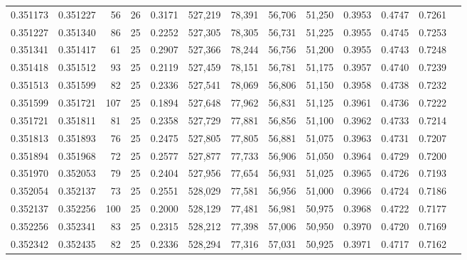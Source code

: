 \begin{tabular}{rrrrrrrrrrrrr}
0.351173 & 0.351227 &    56 &  26 &                                     0.3171 & 527,219 &  78,391 &  56,706 &  51,250 & 0.3953 & 0.4747 & 0.7261 \\
0.351227 & 0.351340 &    86 &  25 &                                     0.2252 & 527,305 &  78,305 &  56,731 &  51,225 & 0.3955 & 0.4745 & 0.7253 \\
0.351341 & 0.351417 &    61 &  25 &                                     0.2907 & 527,366 &  78,244 &  56,756 &  51,200 & 0.3955 & 0.4743 & 0.7248 \\
0.351418 & 0.351512 &    93 &  25 &                                     0.2119 & 527,459 &  78,151 &  56,781 &  51,175 & 0.3957 & 0.4740 & 0.7239 \\
0.351513 & 0.351599 &    82 &  25 &                                     0.2336 & 527,541 &  78,069 &  56,806 &  51,150 & 0.3958 & 0.4738 & 0.7232 \\
0.351599 & 0.351721 &   107 &  25 &                                     0.1894 & 527,648 &  77,962 &  56,831 &  51,125 & 0.3961 & 0.4736 & 0.7222 \\
0.351721 & 0.351811 &    81 &  25 &                                     0.2358 & 527,729 &  77,881 &  56,856 &  51,100 & 0.3962 & 0.4733 & 0.7214 \\
0.351813 & 0.351893 &    76 &  25 &                                     0.2475 & 527,805 &  77,805 &  56,881 &  51,075 & 0.3963 & 0.4731 & 0.7207 \\
0.351894 & 0.351968 &    72 &  25 &                                     0.2577 & 527,877 &  77,733 &  56,906 &  51,050 & 0.3964 & 0.4729 & 0.7200 \\
0.351970 & 0.352053 &    79 &  25 &                                     0.2404 & 527,956 &  77,654 &  56,931 &  51,025 & 0.3965 & 0.4726 & 0.7193 \\
0.352054 & 0.352137 &    73 &  25 &                                     0.2551 & 528,029 &  77,581 &  56,956 &  51,000 & 0.3966 & 0.4724 & 0.7186 \\
0.352137 & 0.352256 &   100 &  25 &                                     0.2000 & 528,129 &  77,481 &  56,981 &  50,975 & 0.3968 & 0.4722 & 0.7177 \\
0.352256 & 0.352341 &    83 &  25 &                                     0.2315 & 528,212 &  77,398 &  57,006 &  50,950 & 0.3970 & 0.4720 & 0.7169 \\
0.352342 & 0.352435 &    82 &  25 &                                     0.2336 & 528,294 &  77,316 &  57,031 &  50,925 & 0.3971 & 0.4717 & 0.7162 \\

\end{tabular}
